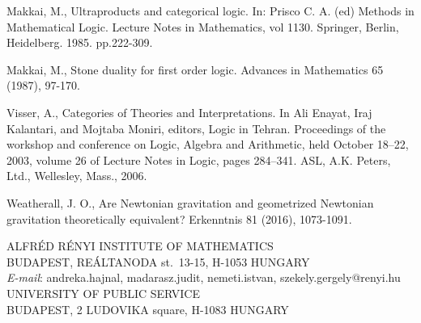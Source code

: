\documentclass[12pt,leqno]{article}
\newcommand{\comment}[1]{}
\begin{document}
\begin{thebibliography}{}
 Makkai, M., Ultraproducts and categorical logic.  In:
 Prisco C. A. (ed) Methods in Mathematical Logic. Lecture Notes in Mathematics, vol 1130.
 Springer, Berlin, Heidelberg. 1985. pp.222-309.

 Makkai, M., Stone duality for first order logic.
Advances in Mathematics 65 (1987), 97-170.

 Visser, A.,  Categories of Theories and Interpretations. In Ali Enayat, Iraj Kalantari, and
Mojtaba Moniri, editors, Logic in Tehran. Proceedings of the workshop and conference
on Logic, Algebra and Arithmetic, held October 18–22, 2003, volume 26 of Lecture Notes
in Logic, pages 284–341. ASL, A.K. Peters, Ltd., Wellesley, Mass., 2006.

 Weatherall, J. O., Are Newtonian gravitation and geometrized
Newtonian gravitation theoretically equivalent? Erkenntnis 81 (2016), 1073-1091.

\end{thebibliography}

\vspace*{10pt}

\comment{\address{ALFR\'ED R\'ENYI INSTITUTE OF MATHEMATICS\\
BUDAPEST, RE\'ALTANODA st.\ 13-15, H-1053 HUNGARY\\
{\it E-mail}: {andreka.hajnal, madarasz.judit, nemeti.istvan, szekely.gergely}@renyi.hu\\
UNIVERSITY OF PUBLIC SERVICE\\
BUDAPEST, 2 LUDOVIKA square, H-1083 HUNGARY}
\clearpage}
\noindent ALFR\'ED R\'ENYI INSTITUTE OF MATHEMATICS\\
		BUDAPEST, RE\'ALTANODA st.\ 13-15, H-1053 HUNGARY\\
		{\it E-mail}: {andreka.hajnal, madarasz.judit, nemeti.istvan, szekely.gergely}@renyi.hu\\
		UNIVERSITY OF PUBLIC SERVICE\\
		BUDAPEST, 2 LUDOVIKA square, H-1083 HUNGARY
\end{document}
